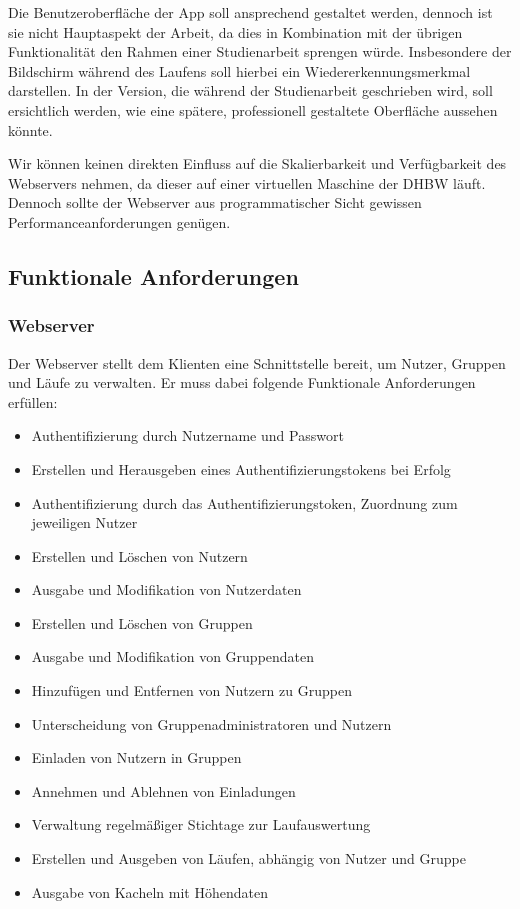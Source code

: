 Die Benutzeroberfläche der App soll ansprechend gestaltet werden, dennoch ist sie nicht Hauptaspekt der Arbeit, da dies in Kombination mit der übrigen Funktionalität den Rahmen einer Studienarbeit sprengen würde. Insbesondere der Bildschirm während des Laufens soll hierbei ein Wiedererkennungsmerkmal darstellen. In der Version, die während der Studienarbeit geschrieben wird, soll ersichtlich werden, wie eine spätere, professionell gestaltete Oberfläche aussehen könnte.

Wir können keinen direkten Einfluss auf die Skalierbarkeit und Verfügbarkeit des Webservers nehmen, da dieser auf einer virtuellen Maschine der DHBW läuft. Dennoch sollte der Webserver aus programmatischer Sicht gewissen Performanceanforderungen genügen.
\subsection{Funktionale Anforderungen}
\subsubsection{Webserver}
Der Webserver stellt dem Klienten eine Schnittstelle bereit, um Nutzer, Gruppen und Läufe zu verwalten. Er muss dabei folgende Funktionale Anforderungen erfüllen:
\begin{itemize}
\item Authentifizierung durch Nutzername und Passwort
\item Erstellen und Herausgeben eines Authentifizierungstokens bei Erfolg
\item Authentifizierung durch das Authentifizierungstoken, Zuordnung zum jeweiligen Nutzer
\item Erstellen und Löschen von Nutzern
\item Ausgabe und Modifikation von Nutzerdaten
\item Erstellen und Löschen von Gruppen
\item Ausgabe und Modifikation von Gruppendaten
\item Hinzufügen und Entfernen von Nutzern zu Gruppen
\item Unterscheidung von Gruppenadministratoren und Nutzern
\item Einladen von Nutzern in Gruppen
\item Annehmen und Ablehnen von Einladungen
\item Verwaltung regelmäßiger Stichtage zur Laufauswertung
\item Erstellen und Ausgeben von Läufen, abhängig von Nutzer und Gruppe
\item Ausgabe von Kacheln mit Höhendaten
\end{itemize}
